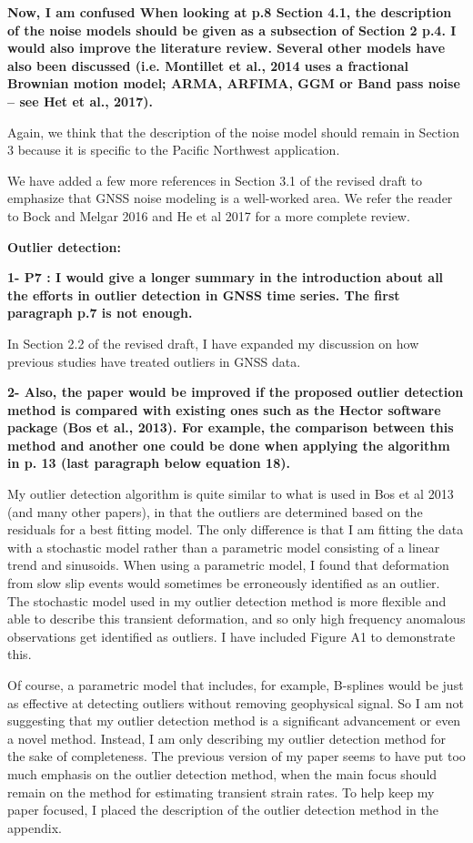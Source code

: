 \documentclass[10pt,a4paper]{letter}
\begin{document}
\begin{letter}{}
\textbf{Now, I am confused When looking at p.8 Section 4.1, the
description of the noise models should be given as a subsection of
Section 2 p.4. I would also improve the literature review. Several
other models have also been discussed (i.e. Montillet et al., 2014
uses a fractional Brownian motion model; ARMA, ARFIMA, GGM or Band
pass noise – see Het et al., 2017).}

Again, we think that the description of the noise model should remain
in Section 3 because it is specific to the Pacific Northwest
application. 

We have added a few more references in Section 3.1 of the revised
draft to emphasize that GNSS noise modeling is a well-worked area. We
refer the reader to Bock and Melgar 2016 and He et al 2017 for a more
complete review.

\textbf{Outlier detection:}

\textbf{1- P7 : I would give a longer summary in the introduction about all
the efforts in outlier detection in GNSS time series. The first
paragraph p.7 is not enough.}

In Section 2.2 of the revised draft, I have expanded my discussion on
how previous studies have treated outliers in GNSS data.

\textbf{2- Also, the paper would be improved if the proposed outlier detection
method is compared with existing ones such as the Hector software
package (Bos et al., 2013). For example, the comparison between this
method and another one could be done when applying the algorithm in p.
13 (last paragraph below equation 18).}

My outlier detection algorithm is quite similar to what is used in Bos
et al 2013 (and many other papers), in that the outliers are
determined based on the residuals for a best fitting model. The only
difference is that I am fitting the data with a stochastic model
rather than a parametric model consisting of a linear trend and
sinusoids. When using a parametric model, I found that deformation
from slow slip events would sometimes be erroneously identified as an
outlier. The stochastic model used in my outlier detection method is
more flexible and able to describe this transient deformation, and so
only high frequency anomalous observations get identified as outliers.
I have included Figure A1 to demonstrate this.

Of course, a parametric model that includes, for example, B-splines
would be just as effective at detecting outliers without removing
geophysical signal. So I am not suggesting that my outlier detection
method is a significant advancement or even a novel method. Instead, I
am only describing my outlier detection method for the sake of
completeness. The previous version of my paper seems to have put too
much emphasis on the outlier detection method, when the main focus
should remain on the method for estimating transient strain rates. To
help keep my paper focused, I placed the description of the outlier
detection method in the appendix.


\end{letter}
\end{document}
